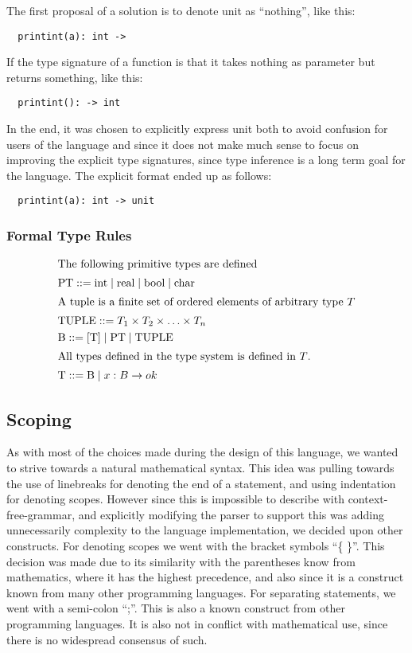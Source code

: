 The first proposal of a solution is to denote unit as \enquote{nothing}, like this:
\begin{verbatim}
  printint(a): int ->
\end{verbatim}
If the type signature of a function is that it takes nothing as parameter but returns something, like this:
\begin{verbatim}
  printint(): -> int
\end{verbatim}

In the end, it was chosen to explicitly express unit both to avoid confusion for users of the language and since it does not make much sense to focus on improving the explicit type signatures, since type inference is a long term goal for the language. The explicit format ended up as follows:
\begin{verbatim}
  printint(a): int -> unit
\end{verbatim}

\subsubsection{Formal Type Rules}

\begin{align*}
\intertext{The following primitive types are defined}
&\text{PT} ::= \text{int} \mid \text{real} \mid \text{bool} \mid \text{char}
\\
\intertext{A tuple is a finite set of ordered elements of arbitrary type $T$}
&\text{TUPLE} ::= T_1 \times T_2 \times \ldots \times T_n
\\            
&\text{B} ::=  \left[ \text{T} \right] \mid \text{PT} \mid \text{TUPLE}
\\            
\intertext{All types defined in the type system is defined in $T$.}
&\text{T} ::= \text{B} \mid x : B \rightarrow ok
\end{align*}

\subsection{Scoping}

As with most of the choices made during the design of this language, we wanted to strive towards a natural mathematical syntax. This idea was pulling towards the use of linebreaks for denoting the end of a statement, and using indentation for denoting scopes. However since this is impossible to describe with context-free-grammar, and explicitly modifying the parser to support this was adding unnecessarily complexity to the language implementation, we decided upon other constructs.
For denoting scopes we went with the bracket symbols \enquote{\{ \}}. This decision was made due to its similarity with the parentheses know from mathematics, where it has the highest precedence, and also since it is a construct known from many other programming languages. For separating statements, we went with a semi-colon \enquote{;}. This is also a known construct from other programming languages. It is also not in conflict with mathematical use, since there is no widespread consensus of such.


